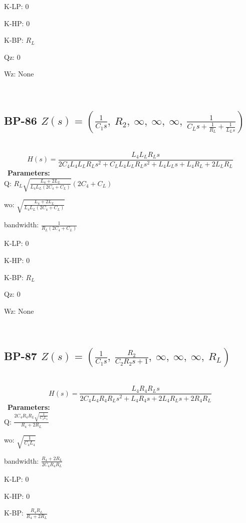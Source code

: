 \documentclass{article}
\begin{document}
K-LP: $0$\ 

K-HP: $0$\ 

K-BP: $R_{L}$\ 

Qz: $0$\ 

Wz: $\text{None}$\ 

\ 

\subsection{BP-86 $Z(s) = \left( \frac{1}{C_{1} s}, \  R_{2}, \  \infty, \  \infty, \  \infty, \  \frac{1}{C_{L} s + \frac{1}{R_{L}} + \frac{1}{L_{L} s}}\right)$ } \ 
\textbf{\[H(s) = \frac{L_{4} L_{L} R_{L} s}{2 C_{4} L_{4} L_{L} R_{L} s^{2} + C_{L} L_{4} L_{L} R_{L} s^{2} + L_{4} L_{L} s + L_{4} R_{L} + 2 L_{L} R_{L}}\] } \ 
\textbf{Parameters:}\\ 

Q: $R_{L} \sqrt{\frac{L_{4} + 2 L_{L}}{L_{4} L_{L} \left(2 C_{4} + C_{L}\right)}} \left(2 C_{4} + C_{L}\right)$\ 

wo: $\sqrt{\frac{L_{4} + 2 L_{L}}{L_{4} L_{L} \left(2 C_{4} + C_{L}\right)}}$\ 

bandwidth: $\frac{1}{R_{L} \left(2 C_{4} + C_{L}\right)}$\ 

K-LP: $0$\ 

K-HP: $0$\ 

K-BP: $R_{L}$\ 

Qz: $0$\ 

Wz: $\text{None}$\ 

\ 

\subsection{BP-87 $Z(s) = \left( \frac{1}{C_{1} s}, \  \frac{R_{2}}{C_{2} R_{2} s + 1}, \  \infty, \  \infty, \  \infty, \  R_{L}\right)$ } \ 
\textbf{\[H(s) = \frac{L_{4} R_{4} R_{L} s}{2 C_{4} L_{4} R_{4} R_{L} s^{2} + L_{4} R_{4} s + 2 L_{4} R_{L} s + 2 R_{4} R_{L}}\] } \ 
\textbf{Parameters:}\\ 

Q: $\frac{2 C_{4} R_{4} R_{L} \sqrt{\frac{1}{C_{4} L_{4}}}}{R_{4} + 2 R_{L}}$\ 

wo: $\sqrt{\frac{1}{C_{4} L_{4}}}$\ 

bandwidth: $\frac{R_{4} + 2 R_{L}}{2 C_{4} R_{4} R_{L}}$\ 

K-LP: $0$\ 

K-HP: $0$\ 

K-BP: $\frac{R_{4} R_{L}}{R_{4} + 2 R_{L}}$\ 
\end{document}
